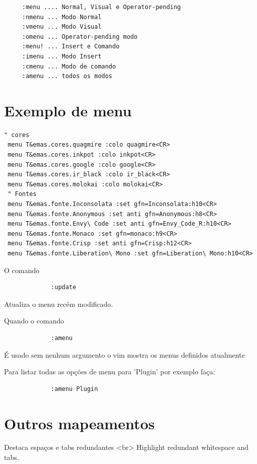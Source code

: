 \documentclass[10pt,a4paper,openany]{book}
\begin{document}
\begin{verbatim}
	 :menu .... Normal, Visual e Operator-pending
	 :nmenu ... Modo Normal
	 :vmenu ... Modo Visual
	 :omenu ... Operator-pending modo
	 :menu! ... Insert e Comando
	 :imenu ... Modo Insert
	 :cmenu ... Modo de comando
	 :amenu ... todos os modos
\end{verbatim}

\section{Exemplo de menu}
\label{Exemplo de menu}

\begin{verbatim}
" cores
 menu T&emas.cores.quagmire :colo quagmire<CR>
 menu T&emas.cores.inkpot :colo inkpot<CR>
 menu T&emas.cores.google :colo google<CR>
 menu T&emas.cores.ir_black :colo ir_black<CR>
 menu T&emas.cores.molokai :colo molokai<CR>
 " Fontes
 menu T&emas.fonte.Inconsolata :set gfn=Inconsolata:h10<CR>
 menu T&emas.fonte.Anonymous :set anti gfn=Anonymous:h8<CR>
 menu T&emas.fonte.Envy\ Code :set anti gfn=Envy_Code_R:h10<CR>
 menu T&emas.fonte.Monaco :set gfn=monaco:h9<CR>
 menu T&emas.fonte.Crisp :set anti gfn=Crisp:h12<CR>
 menu T&emas.fonte.Liberation\ Mono :set gfn=Liberation\ Mono:h10<CR>
\end{verbatim}

O comando

\begin{verbatim}
			 :update
\end{verbatim}

Atualiza o menu recém modificado.

Quando o comando

\begin{verbatim}
			 :amenu
\end{verbatim}

É usado sem nenhum argumento o vim mostra os menus definidos atualmente

Para listar todas as opções de menu para 'Plugin' por exemplo faça:

\begin{verbatim}
			 :amenu Plugin
\end{verbatim}

\section{Outros mapeamentos}
\label{Outros mapeamentos}

Destaca espaços e tabs redundantes <br>
Highlight redundant whitespace and tabs.
\end{document}
